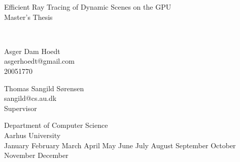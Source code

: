 \documentclass[a4paper,english]{report}
\begin{document}
\begin{titlepage}

\thispagestyle{empty}
\centering
    { \baselineskip=24pt
      \vspace*{80pt}
              {\LARGE Efficient Ray Tracing of Dynamic Scenes on the GPU} \\
              Master's Thesis
              \vspace*{20pt}
              \\
              \vspace*{40pt}
              \\
              \begin{minipage}{0.4\textwidth}
                \centering
                Asger Dam Hoedt \\ asgerhoedt@gmail.com \\ 20051770
              \end{minipage}
              \begin{minipage}{0.4\textwidth}
                \centering
                Thomas Sangild Sørensen \\ sangild@cs.au.dk \\ Supervisor
              \end{minipage}
    }
    \vfill
    \small
    Department of Computer Science\\
    Aarhus University\\
    \ifcase \month
    \or January
    \or February
    \or March
    \or April
    \or May
    \or June
    \or July
    \or August
    \or September
    \or October
    \or November
    \or December
    \fi
    \space
    \number\year
\end{titlepage}

\clearpage{}



\tableofcontents

\clearpage{}


\end{document}
